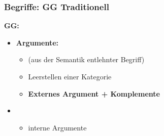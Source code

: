 \begin{frame}
\frametitle{Begriffe: GG \vs Traditionell}

\begin{minipage}[b]{0.47\textwidth}

	\textbf{GG:}

	\begin{itemize}
		\item \textbf{Argumente:}
		\begin{itemize}
			\item (aus der Semantik entlehnter Begriff)
			
			\item Leerstellen einer Kategorie 
			
			\item \textbf{Externes Argument + Komplemente}
		\end{itemize}	
\medskip		
		\item {}
		\begin{itemize}
			\item interne Argumente
		\end{itemize}
		
	\end{itemize}	
\end{minipage}  
\begin{minipage}[b]{0.48\textwidth}
	\begin{figure}
	\centering

	\end{figure}
\end{minipage}

\end{frame}


